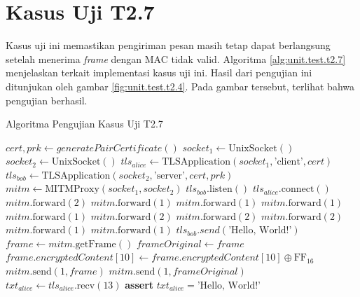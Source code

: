 \section{Kasus Uji T2.7}

Kasus uji ini memastikan pengiriman pesan masih tetap dapat berlangsung setelah menerima \emph{frame} dengan MAC tidak valid. Algoritma \ref{alg:unit.test.t2.7} menjelaskan terkait implementasi kasus uji ini. Hasil dari pengujian ini ditunjukan oleh gambar \ref{fig:unit.test.t2.4}. Pada gambar tersebut, terlihat bahwa pengujian berhasil.


\begin{algorithm}
  \caption{Algoritma Pengujian Kasus Uji T2.7}
  \label{alg:unit.test.t2.7}
  \begin{algorithmic}
    \State $cert, prk \gets generatePairCertificate()$
    \State $socket_1 \gets \text{UnixSocket}()$
    \State $socket_2 \gets \text{UnixSocket}()$
    \State $tls_{alice} \gets \text{TLSApplication}(socket_1, \text{'client'}, cert)$ 
    \State $tls_{bob} \gets \text{TLSApplication}(socket_2, \text{'server'}, cert, prk)$
    \State $mitm \gets \text{MITMProxy}(socket_1, socket_2)$
    \State
    \State $tls_{bob}.\text{listen}()$  
    \State $tls_{alice}.\text{connect}()$  
    \State
    \State $mitm.\text{forward}(2)$ 
    \State $mitm.\text{forward}(1)$ 
    \State $mitm.\text{forward}(1)$ 
    \State $mitm.\text{forward}(1)$ 
    \State $mitm.\text{forward}(1)$ 
    \State $mitm.\text{forward}(2)$ 
    \State $mitm.\text{forward}(2)$ 
    \State $mitm.\text{forward}(2)$ 
    \State $mitm.\text{forward}(1)$ 
    \State $mitm.\text{forward}(1)$ 
    \State
    \State $tls_{bob}.send(\text{'Hello, World!'})$
    \State $frame \gets mitm.\text{getFrame}()$
    \State $frameOriginal \gets frame$
    \State $frame.encryptedContent[10] \gets frame.encryptedContent[10] \oplus \text{FF}_{16}$ 
    \State $mitm.\text{send}(1, frame)$
    \State $mitm.\text{send}(1, frameOriginal)$
    \State
    \State $txt_{alice} \gets tls_{alice}.\text{recv}(13)$
    \State \textbf{assert} $txt_{alice} = \text{'Hello, World!'}$
  \end{algorithmic}
\end{algorithm}

